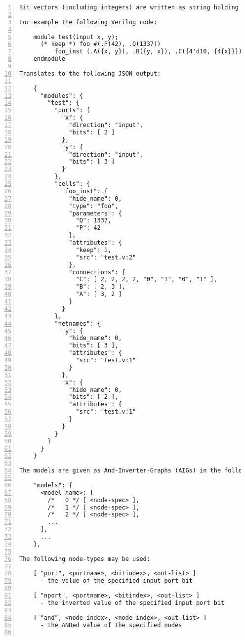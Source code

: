 \begin{lstlisting}[numbers=left,frame=single]
Bit vectors (including integers) are written as string holding the binaryrepresentation of the value. Strings are written as strings, with an appendedblank in cases of strings of the form /[01xz]* */.

For example the following Verilog code:

    module test(input x, y);
      (* keep *) foo #(.P(42), .Q(1337))
          foo_inst (.A({x, y}), .B({y, x}), .C({4'd10, {4{x}}}));
    endmodule

Translates to the following JSON output:

    {
      "modules": {
        "test": {
          "ports": {
            "x": {
              "direction": "input",
              "bits": [ 2 ]
            },
            "y": {
              "direction": "input",
              "bits": [ 3 ]
            }
          },
          "cells": {
            "foo_inst": {
              "hide_name": 0,
              "type": "foo",
              "parameters": {
                "Q": 1337,
                "P": 42
              },
              "attributes": {
                "keep": 1,
                "src": "test.v:2"
              },
              "connections": {
                "C": [ 2, 2, 2, 2, "0", "1", "0", "1" ],
                "B": [ 2, 3 ],
                "A": [ 3, 2 ]
              }
            }
          },
          "netnames": {
            "y": {
              "hide_name": 0,
              "bits": [ 3 ],
              "attributes": {
                "src": "test.v:1"
              }
            },
            "x": {
              "hide_name": 0,
              "bits": [ 2 ],
              "attributes": {
                "src": "test.v:1"
              }
            }
          }
        }
      }
    }

The models are given as And-Inverter-Graphs (AIGs) in the following form:

    "models": {
      <model_name>: [
        /*   0 */ [ <node-spec> ],
        /*   1 */ [ <node-spec> ],
        /*   2 */ [ <node-spec> ],
        ...
      ],
      ...
    },

The following node-types may be used:

    [ "port", <portname>, <bitindex>, <out-list> ]
      - the value of the specified input port bit

    [ "nport", <portname>, <bitindex>, <out-list> ]
      - the inverted value of the specified input port bit

    [ "and", <node-index>, <node-index>, <out-list> ]
      - the ANDed value of the specified nodes


\end{lstlisting}
